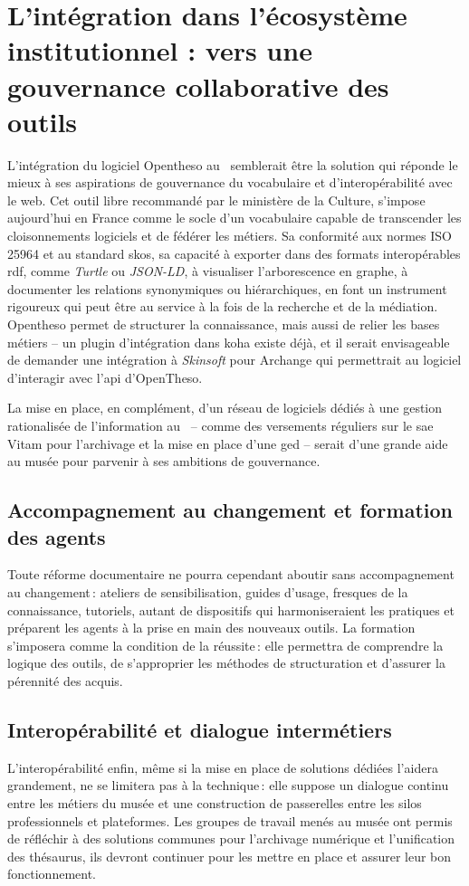 \section{\label{III-A-3}L’intégration dans l’écosystème institutionnel : vers une gouvernance collaborative des outils}

L’intégration du logiciel Opentheso au \mae~semblerait être la solution qui réponde le mieux à ses aspirations de gouvernance du vocabulaire et d'interopérabilité avec le web. Cet outil libre recommandé par le ministère de la Culture, s’impose aujourd'hui en France comme le socle d’un vocabulaire  capable de transcender les cloisonnements logiciels et de fédérer les métiers. Sa conformité aux normes ISO 25964 et au standard \gls{skos}, sa capacité à exporter dans des formats interopérables \gls{rdf}, comme \textit{Turtle} ou \textit{JSON-LD}, à visualiser l’arborescence en graphe, à documenter les relations synonymiques ou hiérarchiques, en font un instrument rigoureux qui peut être au service à la fois de la recherche et de la médiation. Opentheso permet de structurer la connaissance, mais aussi de relier les bases métiers – un plugin d'intégration dans \gls{koha} existe déjà, et il serait envisageable de demander une intégration à \textit{Skinsoft} pour Archange qui permettrait au logiciel d'interagir avec l'\ac{api} d'OpenTheso.

La mise en place, en complément, d'un réseau de logiciels dédiés à une gestion rationalisée de l'information au \mae~-- comme des versements réguliers sur le \gls{sae} Vitam pour l’archivage et la mise en place d'une \gls{ged} – serait d'une grande aide au musée pour parvenir à ses ambitions de gouvernance.

\subsection{Accompagnement au changement et formation des agents}

Toute réforme documentaire ne pourra cependant aboutir sans accompagnement au changement : ateliers de sensibilisation, guides d’usage, fresques de la connaissance, tutoriels, autant de dispositifs qui harmoniseraient les pratiques et préparent les agents à la prise en main des nouveaux outils. La formation s'imposera comme la condition de la réussite : elle permettra de comprendre la logique des outils, de s’approprier les méthodes de structuration et d’assurer la pérennité des acquis.

\subsection{Interopérabilité et dialogue intermétiers}

L’interopérabilité enfin, même si la mise en place de solutions dédiées l'aidera grandement, ne se limitera pas à la technique : elle suppose un dialogue continu entre les métiers du musée et une construction de passerelles entre les silos professionnels et plateformes. Les groupes de travail menés au musée ont permis de réfléchir à des solutions communes pour l’archivage numérique et l'unification des thésaurus, ils devront continuer pour les mettre en place et assurer leur bon fonctionnement. 

